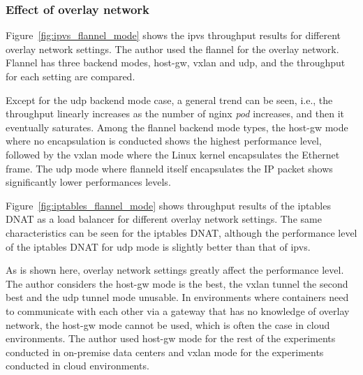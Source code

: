 \FloatBarrier

\subsubsection{Effect of overlay network}

Figure~\ref{fig:ipvs_flannel_mode} shows the ipvs throughput results for different overlay network settings.
The author used the flannel for the overlay network.
Flannel has three backend modes, host-gw, vxlan and udp, and the throughput for each setting are compared.

Except for the udp backend mode case, a general trend can be seen, i.e., the throughput linearly increases as the number of nginx {\em pod} increases, and then it eventually saturates.
Among the flannel backend mode types, the host-gw mode where no encapsulation is conducted shows the highest performance level,
followed by the vxlan mode where the Linux kernel encapsulates the Ethernet frame.
The udp mode where flanneld itself encapsulates the IP packet shows significantly lower performances levels.

Figure~\ref{fig:iptables_flannel_mode} shows throughput results of the iptables DNAT as a load balancer for different overlay network settings.
The same characteristics can be seen for the iptables DNAT, although the performance level of the iptables DNAT for udp mode is slightly better than that of ipvs.

As is shown here, overlay network settings greatly affect the performance level.
The author considers the host-gw mode is the best, the vxlan tunnel the second best and the udp tunnel mode unusable.
In environments where containers need to communicate with each other via a gateway that has no knowledge of overlay network, the host-gw mode cannot be used, which is often the case in cloud environments. 
The author used host-gw mode for the rest of the experiments conducted in on-premise data centers and vxlan mode for the experiments conducted in cloud environments.

